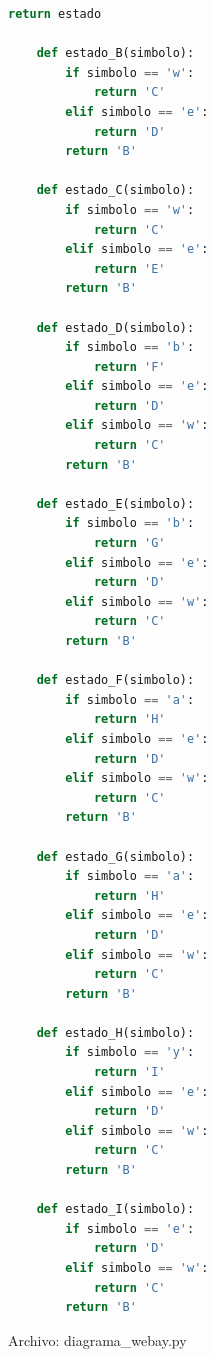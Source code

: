 \begin{lstlisting}[language=Python]
		return estado

	def estado_B(simbolo):
		if simbolo == 'w':
			return 'C'
		elif simbolo == 'e':
			return 'D'
		return 'B'

	def estado_C(simbolo):
		if simbolo == 'w':
			return 'C'
		elif simbolo == 'e':
			return 'E'
		return 'B'

	def estado_D(simbolo):
		if simbolo == 'b':
			return 'F'
		elif simbolo == 'e':
			return 'D'
		elif simbolo == 'w':
			return 'C'
		return 'B'

	def estado_E(simbolo):
		if simbolo == 'b':
			return 'G'
		elif simbolo == 'e':
			return 'D'
		elif simbolo == 'w':
			return 'C'
		return 'B'

	def estado_F(simbolo):
		if simbolo == 'a':
			return 'H'
		elif simbolo == 'e':
			return 'D'
		elif simbolo == 'w':
			return 'C'
		return 'B'

	def estado_G(simbolo):
		if simbolo == 'a':
			return 'H'
		elif simbolo == 'e':
			return 'D'
		elif simbolo == 'w':
			return 'C'
		return 'B'

	def estado_H(simbolo):
		if simbolo == 'y':
			return 'I'
		elif simbolo == 'e':
			return 'D'
		elif simbolo == 'w':
			return 'C'
		return 'B'

	def estado_I(simbolo):
		if simbolo == 'e':
			return 'D'
		elif simbolo == 'w':
			return 'C'
		return 'B'
	\end{lstlisting}
	Archivo: diagrama\_webay.py
